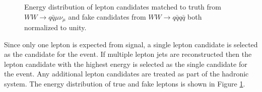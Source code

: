 \begin{figure}
\begin{minipage}{0.48\textwidth}
\caption{Energy distribution of lepton candidates matched to truth from $WW \rightarrow q \bar{q} \mu \nu_\mu $ and fake candidates from $ WW \rightarrow q\bar{q} q \bar{q}$ both normalized to unity.\\}
\label{fig:candE}
\end{minipage}
\end{figure}





Since only one lepton is expected from signal, a single lepton candidate is selected as the candidate for the event. If multiple lepton jets are reconstructed then the lepton candidate with the highest energy is selected as the single candidate for the event. Any additional lepton candidates are treated as part of the hadronic system. The energy distribution of true and fake leptons is shown in Figure \ref{fig:candE}.


